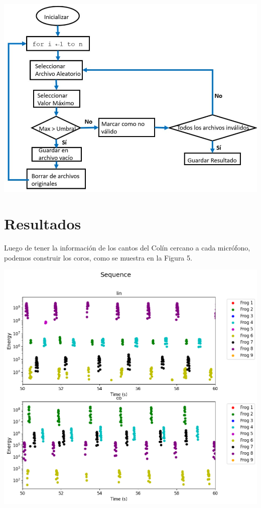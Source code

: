 \documentclass[a0,portrait]{a0poster}
\begin{document}
\begin{multicols}{3}
\begin{center}\vspace{0.1cm}
    \includegraphics[width=0.8\linewidth]{assets/algorithm.jpg}
\end{center}\vspace{0.1cm}



\section*{Resultados}

Luego de tener la información de los cantos del Colín cercano a cada micrófono, podemos construir los coros, como se muestra en la Figura 5.
\begin{center}\vspace{0.1cm}
    \includegraphics[width=0.8\linewidth]{assets/sequence.png}
\end{center}\vspace{0.1cm}


\end{multicols}
\end{document}
